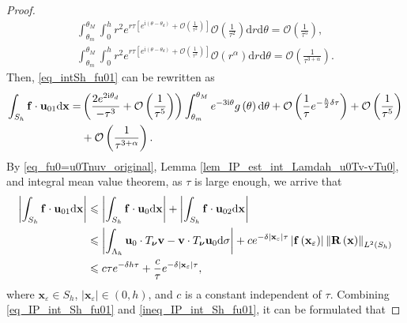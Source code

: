 \documentclass[10pt,a4paper]{amsart}
\begin{document}
\begin{proof}
\begin{align*}
		\int_{\theta_m}^{\theta_M} \int_{0}^{h} r^2 e^{r \tau\left[e^{\mathrm{i}\left(\theta-\theta_d\right)} + \mathcal{O}\left(\frac{1}{\tau^2}\right)\right]} \mathcal{O}\left(\frac{1}{\tau^2}\right) \mathrm{d}r \mathrm{d}\theta = \mathcal{O} \left(\frac{1}{\tau^5}\right) ,\\
		\int_{\theta_m}^{\theta_M} \int_{0}^{h} r^2 e^{r \tau\left[e^{\mathrm{i}\left(\theta-\theta_d\right)} + \mathcal{O}\left(\frac{1}{\tau^2}\right)\right]} \mathcal{O}\left(r^{\alpha}\right) \mathrm{d}r \mathrm{d}\theta = \mathcal{O} \left(\frac{1}{\tau^{3+\alpha}}\right) .
	\end{align*}
	Then, \eqref{eq_intSh_fu01} can be rewritten as
	\begin{align} \label{eq_IP_int_Sh_fu01}
		\int_{S_h} \mathbf{f} \cdot \mathbf{u}_{01} \mathrm{d}\mathbf{x} = & \left(\frac{2e^{2\text{i}\theta_d}}{-\tau^3} + \mathcal{O} \left(\frac{1}{\tau^5}\right)\right)  \int_{\theta_m}^{\theta_M} e^{-3\text{i}\theta} g\left(\theta\right) \mathrm{d}\theta + \mathcal{O} \left( \frac{1}{\tau} e^{-\frac{h}{2}\delta\tau} \right) + \mathcal{O} \left(\frac{1}{\tau^5}\right)\notag \\
		&  + \mathcal{O} \left(\frac{1}{\tau^{3+\alpha}}\right) .
	\end{align}
	By \eqref{eq_fu0=u0Tnuv_original}, Lemma \ref{lem_IP_est_int_Lamdah_u0Tv-vTu0}, and integral mean value theorem, as $ \tau $ is large enough, we arrive that
	\begin{align} \label{ineq_IP_int_Sh_fu01}
		\left|\int_{S_h} \mathbf{f} \cdot \mathbf{u}_{01} \mathrm{d}\mathbf{x}\right| & \leqslant \left|\int_{S_h} \mathbf{f} \cdot \mathbf{u}_{0} \mathrm{d}\mathbf{x}\right| + \left|\int_{S_h} \mathbf{f} \cdot \mathbf{u}_{02} \mathrm{d}\mathbf{x}\right| \notag \\
		& \leqslant \left|\int_{\Lambda_h} \mathbf{u}_0 \cdot T_{\bm{\nu}} \mathbf{v} - \mathbf{v} \cdot T_{\bm{\nu}} \mathbf{u}_0 \mathrm{d}\sigma\right| + ce^{-\delta\left|\mathbf{x}_{\varepsilon}\right|\tau} \left|\mathbf{f}\left(\mathbf{x}_{\varepsilon}\right)\right| \left\|\mathbf{R}\left(\mathbf{x}\right)\right\|_{L^2\left(S_h\right)} \notag \\
		& \leqslant c\tau e^{- \delta h \tau} +  \frac{c}{\tau}e^{-\delta\left|\mathbf{x}_{\varepsilon}\right|\tau} ,
	\end{align}
	where $ \mathbf{x}_{\varepsilon} \in S_h $, $ \left|\mathbf{x}_{\varepsilon}\right|\in\left(0,h\right) $, and $ c $ is a constant independent of $ \tau $. Combining \eqref{eq_IP_int_Sh_fu01} and \eqref{ineq_IP_int_Sh_fu01}, it can be formulated that

\end{proof}
\end{document}

